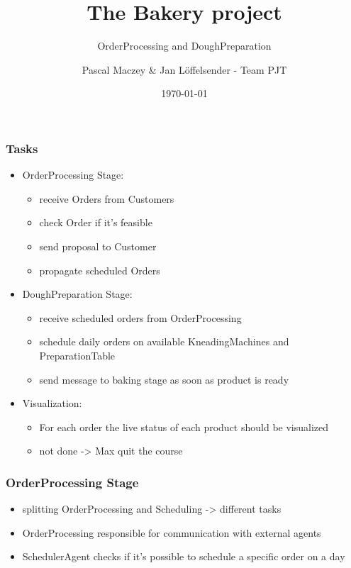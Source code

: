 \documentclass[11pt]{beamer}
\begin{document}
	\author{Pascal Maczey \& Jan Löffelsender - Team PJT}
	\title{The Bakery project}
	\subtitle{OrderProcessing and DoughPreparation}
	\date{\today}
	\begin{frame}[plain]
	\maketitle
\end{frame}

\begin{frame}
\frametitle{Tasks}
\begin{itemize}
	\item OrderProcessing Stage:
	\begin{itemize}
		\item receive Orders from Customers
		\item check Order if it's feasible
		\item send proposal to Customer
		\item propagate scheduled Orders
	\end{itemize}
	\item DoughPreparation Stage:
	\begin{itemize}
		\item receive scheduled orders from OrderProcessing
		\item schedule daily orders on available KneadingMachines and PreparationTable
		\item send message to baking stage as soon as product is ready
	\end{itemize}
	\item Visualization:
	\begin{itemize}
		\item For each order the live status of each product should be visualized
		\item not done -> Max quit the course
	\end{itemize}
\end{itemize}
\end{frame}

\begin{frame}
\frametitle{OrderProcessing Stage}
\begin{itemize}
	\item splitting OrderProcessing and Scheduling -> different tasks
	\item OrderProcessing responsible for communication with external agents
	\item SchedulerAgent checks if it's possible to schedule a specific order on a day
\end{itemize}
\end{frame}
\end{document}
